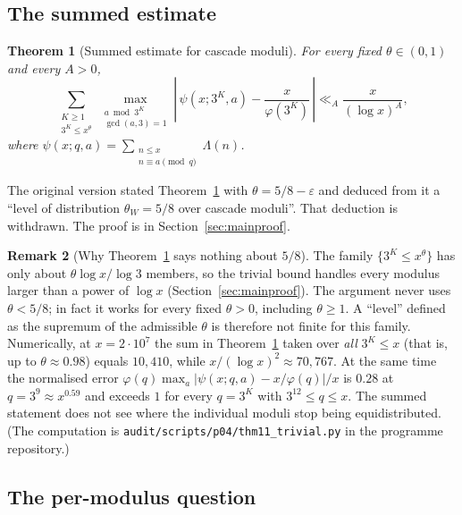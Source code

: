\documentclass[12pt]{amsart}
\theoremstyle{plain}
\newtheorem{theorem}{Theorem}[section]
\theoremstyle{definition}
\newtheorem{remark}[theorem]{Remark}
\begin{document}
\subsection{The summed estimate}

\begin{theorem}[Summed estimate for cascade moduli]
\label{thm:main}
For every fixed $\theta \in (0,1)$ and every $A > 0$,
\[
  \sum_{\substack{K \geq 1 \\ 3^K \leq x^{\theta}}}
  \max_{\substack{a \bmod 3^K \\ \gcd(a,3)=1}}
  \left|\,\psi(x;3^K,a) - \frac{x}{\varphi(3^K)}\,\right|
  \ll_A \frac{x}{(\log x)^A},
\]
where $\psi(x;q,a) = \sum_{\substack{n \leq x \\ n \equiv a \pmod{q}}} \Lambda(n)$.
\end{theorem}

The original version stated Theorem~\ref{thm:main} with
$\theta = 5/8 - \varepsilon$ and deduced from it a ``level of distribution
$\theta_W = 5/8$ over cascade moduli''. That deduction is withdrawn. The
proof is in Section~\ref{sec:mainproof}.

\begin{remark}[Why Theorem~\ref{thm:main} says nothing about $5/8$]
\label{rem:trivial}
The family $\{3^K \leq x^\theta\}$ has only about $\theta\log x/\log 3$
members, so the trivial bound handles every modulus larger than a power of
$\log x$ (Section~\ref{sec:mainproof}). The argument never uses
$\theta < 5/8$; in fact it works for every fixed $\theta > 0$, including
$\theta \geq 1$. A ``level'' defined as the supremum of the admissible
$\theta$ is therefore not finite for this family. Numerically, at
$x = 2\cdot 10^7$ the sum in Theorem~\ref{thm:main} taken over \emph{all}
$3^K \leq x$ (that is, up to $\theta \approx 0.98$) equals $10{,}410$, while
$x/(\log x)^2 \approx 70{,}767$. At the same time the normalised error
$\varphi(q)\max_a|\psi(x;q,a) - x/\varphi(q)|/x$ is $0.28$ at
$q = 3^9 \approx x^{0.59}$ and exceeds $1$ for every $q = 3^K$ with
$3^{12} \leq q \leq x$. The summed statement does not see where the
individual moduli stop being equidistributed. (The computation is
\texttt{audit/scripts/p04/thm11\_trivial.py} in the programme repository.)
\end{remark}

\subsection{The per-modulus question}
\end{document}
